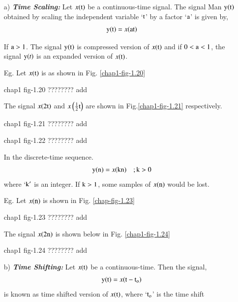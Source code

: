\begin{itemize}
\item[{\rm a)}]{\it \bfseries Time Scaling:} Let $x(\textrm{t})$ be a continuous-time signal. The signal Man $\textrm{y}(\textrm{t})$ obtained by scaling the independent variable `$\textrm{t}$' by a factor `$\textrm{a}$' is given by,
\begin{equation}
{\textrm{y}}{(\textrm{t})}= x {(\textrm{a}\textrm{t})}\label{chap1-eq-1.34}
\end{equation}


If ${\textrm{a}} > 1$. The signal $\textrm{y}{(\textrm{t})}$ is compressed version of $x{(\textrm{t})}$ and if $0 < {\textrm{a}} < 1$, the signal $\textrm{y}{(t)}$ is an expanded version of $x{(\textrm{t})}$.

Eg. Let $x(\textrm{t})$ is as shown in Fig. \ref{chap1-fig-1.20}

\begin{center}
chap1 fig-1.20 ???????? add
\end{center}

The signal $x(2 \textrm{t})$ and $x\left(\frac{1}{2}\textrm{t}\right)$ are shown in Fig.\ref{chap1-fig-1.21} respectively.
\begin{center}
chap1 fig-1.21 ???????? add
\end{center}
\begin{center}
chap1 fig-1.22 ???????? add
\end{center}

In the discrete-time sequence.
\begin{equation}
{\textrm{y}}{(\textrm{n})}= x{(\textrm{k}\textrm{n})} \quad ; \textrm{k} > 0\label{chap1-eq-1.35}
\end{equation}
where `$\textrm{k}'$ is an integer. If $\textrm{k}>1$, some samples of $x(\textrm{n})$ would be lost.

Eg. Let $x(\textrm{n})$ is shown in Fig. \ref{chap-fig-1.23}
\begin{center}
chap1 fig-1.23 ???????? add
\end{center}

The signal $x(2\textrm{n})$ is shown below in Fig. \ref{chap1-fig-1.24}
\begin{center}
chap1 fig-1.24 ???????? add
\end{center}

\item[{\rm b)}] {\it \bfseries Time Shifting:} Let $x(\textrm{t})$ be a continuous-time. Then the signal,
\begin{equation}
{\textrm{y}}{(\textrm{t})} = x{(\textrm{t}-\textrm{t}_{\textrm{o}})}\label{chap1-eq-1.36}
\end{equation}
is known as time shifted version of $x(\textrm{t})$, where  `$\textrm{t}_{\textrm{o}}$' is the time shift


\end{itemize}
